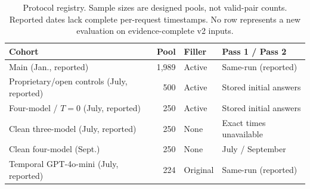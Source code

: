 \begin{table}[t]
\caption{Protocol registry. Sample sizes are designed pools, not valid-pair counts. Reported dates lack complete per-request timestamps. No row represents a new evaluation on evidence-complete v2 inputs.}
\label{tab:protocol_registry}
\centering\small
\setlength{\tabcolsep}{3.5pt}
\begin{tabular}{lrll}
\toprule
Cohort & Pool & Filler & Pass 1 / Pass 2 \\
\midrule
Main (Jan., reported) & 1,989 & Active & Same-run (reported) \\
Proprietary/open controls (July, reported) & 500 & Active & Stored initial answers \\
Four-model / $T=0$ (July, reported) & 250 & Active & Stored initial answers \\
Clean three-model (July, reported) & 250 & None & Exact times unavailable \\
Clean four-model (Sept.) & 250 & None & July / September \\
Temporal GPT-4o-mini (July, reported) & 224 & Original & Same-run (reported) \\
\bottomrule
\end{tabular}
\end{table}
